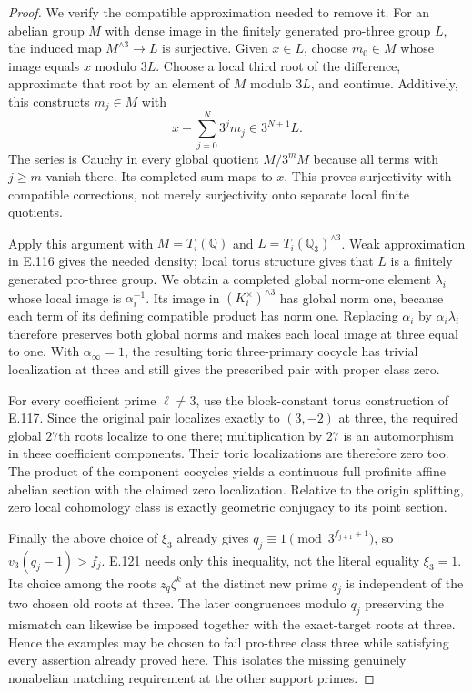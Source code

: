 \begin{proof}
We verify the compatible approximation needed to remove it.
For an abelian group $M$ with dense image in the finitely generated
pro-three group $L$, the induced map $M^{\wedge3}\to L$ is
surjective. Given $x\in L$, choose $m_0\in M$ whose image equals
$x$ modulo $3L$. Choose a local third root of the difference,
approximate that root by an element of $M$ modulo $3L$, and
continue. Additively, this constructs $m_j\in M$ with
\[
 x-\sum_{j=0}^{N}3^j m_j\in3^{N+1}L.
\]
The series is Cauchy in every global quotient $M/3^mM$ because
all terms with $j\ge m$ vanish there. Its completed sum maps to
$x$. This proves surjectivity with compatible corrections, not
merely surjectivity onto separate local finite quotients.

Apply this argument with $M=T_i(\mathbb Q)$ and
$L=T_i(\mathbb Q_3)^{\wedge3}$. Weak approximation in E.116
gives the needed density; local torus structure gives that $L$
is a finitely generated pro-three group. We obtain a completed
global norm-one element $\lambda_i$ whose local image is
$\alpha_i^{-1}$. Its image in $(K_i^\times)^{\wedge3}$ has
global norm one, because each term of its defining compatible
product has norm one. Replacing $\alpha_i$ by $\alpha_i\lambda_i$
therefore preserves both global norms and makes each local image
at three equal to one. With $\alpha_\infty=1$, the resulting
toric three-primary cocycle has trivial localization at three
and still gives the prescribed pair with proper class zero.

For every coefficient prime $\ell\ne3$, use the block-constant
torus construction of E.117. Since the original pair localizes
exactly to $(3,-2)$ at three, the required global $27$th roots
localize to one there; multiplication by $27$ is an automorphism
in these coefficient components. Their toric localizations are
therefore zero too. The product of the component cocycles yields
a continuous full profinite affine abelian section with the
claimed zero localization. Relative to the origin splitting, zero
local cohomology class is exactly geometric conjugacy to its point
section.

Finally the above choice of $\xi_3$ already gives
$q_j\equiv1\pmod{3^{f_{j+1}+1}}$, so
$v_3(q_j-1)>f_j$. E.121 needs only this inequality, not the
literal equality $\xi_3=1$. Its choice among the roots
$z_q\zeta^k$ at the distinct new prime $q_j$ is independent of
the two chosen old roots at three. The later congruences modulo
$q_j$ preserving the mismatch can likewise be imposed together
with the exact-target roots at three. Hence the examples may be
chosen to fail pro-three class three while satisfying every
assertion already proved here. This isolates the missing genuinely
nonabelian matching requirement at the other support primes.
\end{proof}

